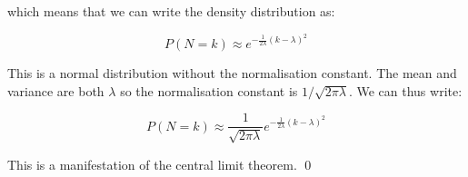 \documentclass[12pt]{article}
\begin{document}
which means that we can write the density distribution as:

\begin{equation}
    P(N = k) \approx e^{-\frac{1}{2\lambda} (k - \lambda)^{2}}
\end{equation}

This is a normal distribution without the normalisation constant. The mean and variance are both $\lambda$ so the normalisation constant is $1/\sqrt{2\pi\lambda}$. We can thus write:

\begin{equation}
    P(N = k) \approx \frac{1}{\sqrt{2\pi\lambda}} e^{-\frac{1}{2\lambda} (k - \lambda)^{2}}
\end{equation}

This is a manifestation of the central limit theorem.
\qed
\end{document}
